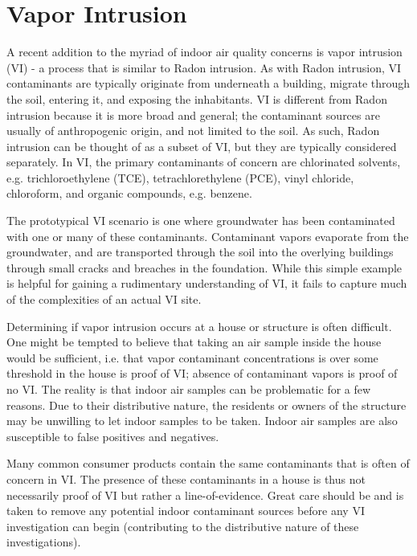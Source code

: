 \documentclass[../thesis.tex]{subfiles}
\begin{document}
\section{Vapor Intrusion}

A recent addition to the myriad of indoor air quality concerns is vapor intrusion (VI) - a process that is similar to Radon intrusion.
As with Radon intrusion, VI contaminants are typically originate from underneath a building, migrate through the soil, entering it, and exposing the inhabitants.
VI is different from Radon intrusion because it is more broad and general; the contaminant sources are usually of anthropogenic origin, and not limited to the soil.
As such, Radon intrusion can be thought of as a subset of VI, but they are typically considered separately.
In VI, the primary contaminants of concern are chlorinated solvents, e.g. trichloroethylene (TCE), tetrachlorethylene (PCE), vinyl chloride, chloroform, and organic compounds, e.g. benzene.

The prototypical VI scenario is one where groundwater has been contaminated with one or many of these contaminants.
Contaminant vapors evaporate from the groundwater, and are transported through the soil into the overlying buildings through small cracks and breaches in the foundation.
While this simple example is helpful for gaining a rudimentary understanding of VI, it fails to capture much of the complexities of an actual VI site.

Determining if vapor intrusion occurs at a house or structure is often difficult.
One might be tempted to believe that taking an air sample inside the house would be sufficient, i.e. that vapor contaminant concentrations is over some threshold in the house is proof of VI; absence of contaminant vapors is proof of no VI.
The reality is that indoor air samples can be problematic for a few reasons.
Due to their distributive nature, the residents or owners of the structure may be unwilling to let indoor samples to be taken.
Indoor air samples are also susceptible to false positives and negatives.

Many common consumer products contain the same contaminants that is often of concern in VI.
The presence of these contaminants in a house is thus not necessarily proof of VI but rather a line-of-evidence.
Great care should be and is taken to remove any potential indoor contaminant sources before any VI investigation can begin (contributing to the distributive nature of these investigations).
\end{document}
